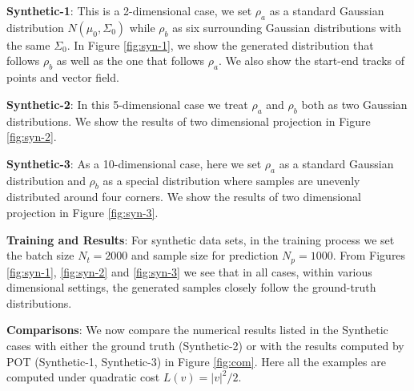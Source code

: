 \documentclass{article}
\begin{document}
\textbf{Synthetic-1}: This is a 2-dimensional case, we set $\rho_a$ as a standard Gaussian distribution $N(\mu_0,\Sigma_0)$ while $\rho_b$ as six surrounding Gaussian distributions with the same $\Sigma_0$. In Figure \ref{fig:syn-1}, we show the generated distribution that follows $\rho_b$ as well as the one that follows $\rho_a$. We also show the start-end tracks of points and vector field.

\vspace{-0.2em}
\textbf{Synthetic-2}: In this 5-dimensional case we treat $\rho_a$ and $\rho_b$ both as two Gaussian distributions. We show the results of two dimensional projection in Figure \ref{fig:syn-2}.
\vspace{-0.2em}

\textbf{Synthetic-3}: As a 10-dimensional case, here we set $\rho_a$ as a standard Gaussian distribution and $\rho_b$ as a special distribution where samples are unevenly distributed around four corners. We show the results of two dimensional projection in Figure \ref{fig:syn-3}.

\vspace{-0.2em}

\textbf{Training and Results}: For synthetic data sets, in the training process we set the batch size $N_t=2000$ and sample size for prediction $N_p=1000$. From Figures \ref{fig:syn-1}, \ref{fig:syn-2} and \ref{fig:syn-3} we see that in all cases, within various dimensional settings, the generated samples closely follow the ground-truth distributions.


\vspace{-0.2em}

\textbf{Comparisons}: We now compare the numerical results listed in the Synthetic cases with either the ground truth (Synthetic-2) or with the results computed by POT (Synthetic-1, Synthetic-3) in Figure \ref{fig:com}. Here all the examples are computed under quadratic cost $L(v)=|v|^2/2$.
\end{document}
